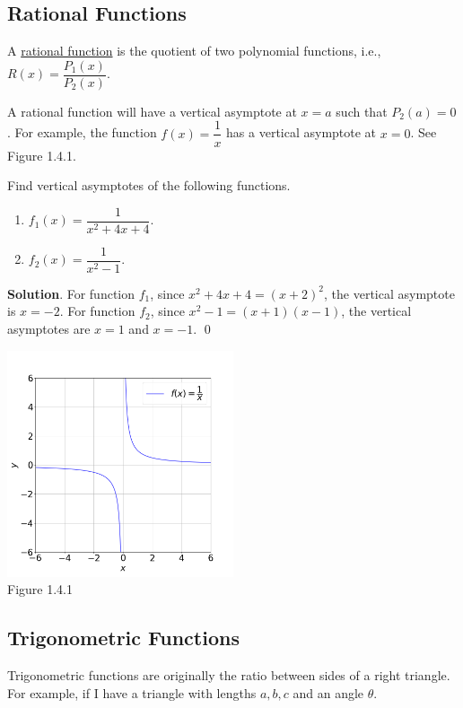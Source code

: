 \documentclass[11pt]{book}
\theoremstyle{break}
\theoremstyle{no_label}
\newcommand{\figtag}[1]{\\[-1.2em]Figure {#1}}
\numberwithin{equation}{section}
\begin{document}
\subsection*{Rational Functions}

\begin{definition}
    A \underline{rational function} is the quotient of two polynomial functions, i.e., $R(x)=\dfrac{P_1(x)}{P_2(x)}$.
\end{definition}

A rational function will have a vertical asymptote at $x=a$ such that $P_2(a)=0$. For example, the function $f(x)=\dfrac{1}{x}$ has a vertical asymptote at $x=0$. See Figure 1.4.1.

\begin{example}
    Find vertical asymptotes of the following functions.
    \begin{enumerate}
        \item $f_1(x)=\dfrac{1}{x^2+4x+4}$.
        \item $f_2(x)=\dfrac{1}{x^2-1}$.
    \end{enumerate}
\end{example}
\textbf{Solution}. For function $f_1$, since $x^2+4x+4=(x+2)^2$, the vertical asymptote is $x=-2$. For function $f_2$, since $x^2-1=(x+1)(x-1)$, the vertical asymptotes are $x=1$ and $x=-1$. \qed

\begin{center}
    \includegraphics[width=0.5\textwidth]{reciprocal_of_x.png}\figtag{1.4.1}
\end{center}

\subsection*{Trigonometric Functions}

Trigonometric functions are originally the ratio between sides of a right triangle. For example, if I have a triangle with lengths $a, b, c$ and an angle $\theta$.
\end{document}
